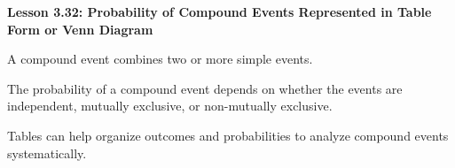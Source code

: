 \begin{center}
\textbf{Lesson 3.32: Probability of Compound Events Represented in Table Form or Venn Diagram}
\end{center}

\vspace*{-1.5ex}

\noindent A compound event combines two or more simple events.

\noindent The probability of a compound event depends on whether the events are independent, mutually exclusive, or non-mutually exclusive.

\noindent Tables can help organize outcomes and probabilities to analyze compound events systematically.

